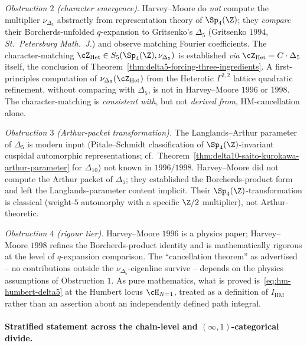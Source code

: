 \emph{Obstruction $2$ (character emergence).} Harvey--Moore do
\emph{not} compute the multiplier $\nu_{\Delta_5}$ abstractly from
representation theory of $\Sp_4(\Z)$; they \emph{compare} their
Borcherds-unfolded $q$-expansion to Gritsenko's $\Delta_5$
(Gritsenko $1994$, \emph{St.\ Petersburg Math.\ J.}) and observe
matching Fourier coefficients. The character-matching
$\cZ_{\mathrm{Het}} \in S_5(\Sp_4(\Z), \nu_{\Delta_5})$ is
established \emph{via} $\cZ_{\mathrm{Het}} = C \cdot \Delta_5$
itself, the conclusion of
Theorem~\ref{thm:delta5-forcing-three-ingredients}. A
first-principles computation of
$\nu_{\Delta_5}(\cZ_{\mathrm{Het}})$ from the Heterotic
$\Gamma^{2,2}$ lattice quadratic refinement, without comparing
with $\Delta_5$, is not in Harvey--Moore $1996$ or $1998$. The
character-matching is \emph{consistent with}, but not
\emph{derived from}, HM-cancellation alone.

\emph{Obstruction $3$ (Arthur-packet transformation).} The
Langlands--Arthur parameter of $\Delta_5$ is modern input
(Pitale--Schmidt classification of $\Sp_4(\Z)$-invariant cuspidal
automorphic representations;
cf.~Theorem~\ref{thm:delta10-saito-kurokawa-arthur-parameter} for
$\Delta_{10}$) not known in $1996/1998$. Harvey--Moore did not
compute the Arthur packet of $\Delta_5$; they established the
Borcherds-product form and left the Langlands-parameter content
implicit. Their $\Sp_4(\Z)$-transformation is classical
(weight-$5$ automorphy with a specific $\Z/2$ multiplier), not
Arthur-theoretic.

\emph{Obstruction $4$ (rigour tier).} Harvey--Moore $1996$ is a
physics paper; Harvey--Moore $1998$ refines the Borcherds-product
identity and is mathematically rigorous at the level of
$q$-expansion comparison. The ``cancellation theorem'' as
advertised -- no contributions outside the
$\nu_{\Delta_5}$-eigenline survive -- depends on the physics
assumptions of Obstruction $1$. As pure mathematics, what is
proved is~\eqref{eq:hm-humbert-delta5} at the Humbert locus
$\cH_{N=1}$, treated as a definition of $I_{\mathrm{HM}}$ rather
than an assertion about an independently defined path integral.

\paragraph{Stratified statement across the chain-level and
$(\infty,1)$-categorical divide.}

